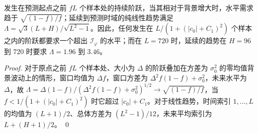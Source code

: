 {\begin{corollary}[阶跃与趋势]
\label{cor:steps}
发生在预测起点之前 $fL$ 个样本处的持续阶跃，当其相对于背景增大时，水平需求趋于 $\sqrt{(1-f)/f}$；延续到预测时域的纯线性趋势满足 $\Lambda=\sqrt3(L+H)/\sqrt{L^2-1}$。因此，任何发生在 $L/(1+(|c_0|+C_1)^2)$ 个样本之内的阶跃都要求一个超出 $\mathcal I_\varphi$ 的水平；而在 $L=720$ 时，延续的趋势在 $H=96$ 到 $720$ 时要求 $\Lambda=1.96$ 到 $3.46$。
\end{corollary}

\begin{proof}
对于原点之前 $fL$ 个样本处、大小为 $\Delta$ 的阶跃叠加在方差为 $\sigma_0^2$ 的零均值背景波动上的情形，窗口均值为 $\Delta f$，窗口方差为 $\Delta^2f(1-f)+\sigma_0^2$，未来水平为 $\Delta$，故 $\Lambda=\Delta(1-f)/(\Delta^2f(1-f)+\sigma_0^2)^{1/2}\to\sqrt{(1-f)/f}$，当 $f<1/(1+(|c_0|+C_1)^2)$ 时它超过 $|c_0|+C_1$。对于线性趋势，时间索引 $1,\dots,L$ 的均值为 $(L+1)/2$、总体方差为 $(L^2-1)/12$，未来平均索引为 $L+(H+1)/2$。 \qed
\end{proof}

}

